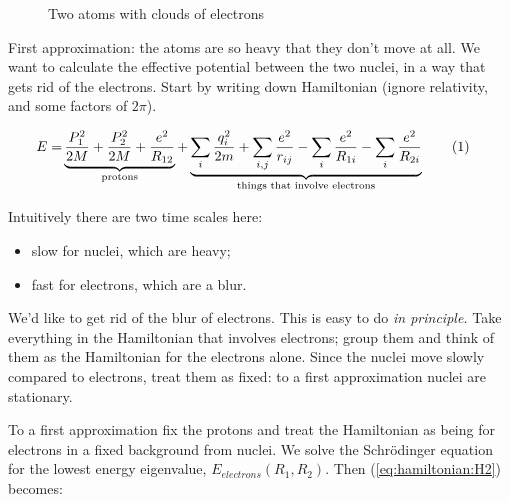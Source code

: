 \documentclass[]{article}
\newcommand\numberthis{\addtocounter{equation}{1}\tag{\theequation}}
\begin{document}
\begin{figure}[H]
	\begin{center}
		\caption{Two atoms with clouds of electrons}\label{fig:3-2-atoms}
	\end{center}
\end{figure}

First approximation: the atoms are so heavy that they don't move at all. We want to calculate the effective potential between the two nuclei, in a way that gets rid of the electrons. Start by writing down Hamiltonian (ignore relativity, and some factors of $2\pi$).

\begin{align*}
	E=& \underbrace{\frac{P_1^2}{2M} + \frac{P_2^2}{2M} + \frac{e^2}{R_{12}}}_\text{protons} + \underbrace{\sum_i \frac{q_i^2}{2m} + \sum_{i,j}\frac{e^2}{r_{ij}}- \sum_i \frac{e^2}{R_{1i}} - \sum_i \frac{e^2}{R_{2i}}}_\text{things that involve electrons} \numberthis \label{eq:hamiltonian:H2}
\end{align*}

Intuitively there are two time scales here:
\begin{itemize}
	\item slow for nuclei, which are heavy;
	\item fast for electrons, which are a blur.
\end{itemize}

We'd like to get rid of the blur of electrons. This is easy to do \emph{in principle.} Take everything in the Hamiltonian that involves electrons; group them and think of them as the Hamiltonian for the electrons alone. Since the nuclei move slowly compared to electrons, treat them as fixed: to a first approximation nuclei are stationary.

To a first approximation fix the protons and treat the Hamiltonian as being for electrons in a fixed background from nuclei. We solve the Schr\"odinger equation for the lowest energy eigenvalue, $E_{electrons}(R_1,R_2)$. Then (\ref{eq:hamiltonian:H2}) becomes:
\end{document}
